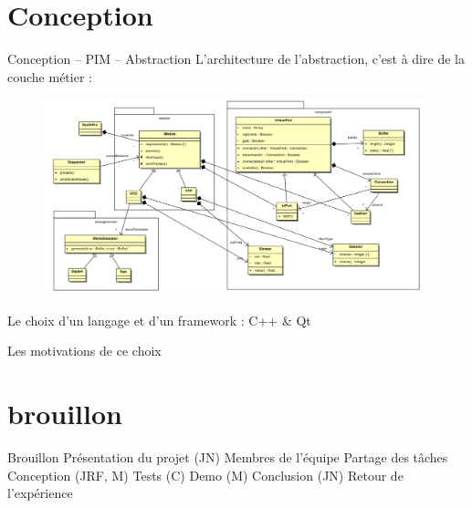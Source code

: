 \documentclass[frenchb]{beamer}
\begin{document}
\section{Conception}
\begin{frame}{Conception -- PIM -- Abstraction}
L'architecture de l'abstraction, c'est à dire de la couche métier :
    \begin{figure}
        \includegraphics[width=11cm ]{../img/ps/pim-abstraction.pdf}
    \end{figure}
\end{frame}

\begin{frame}{Le choix d'un langage et d'un framework : C++ \& Qt}
    \begin{block}{Les motivations de ce choix}
    \end{block}

\end{frame}
\section{brouillon}
\begin{frame}{Brouillon}
Présentation du projet (JN)
Membres de l'équipe
Partage des tâches
Conception (JRF, M)
Tests (C)
Demo (M)
Conclusion (JN)
Retour de l'expérience
\end{frame}
\end{document}
